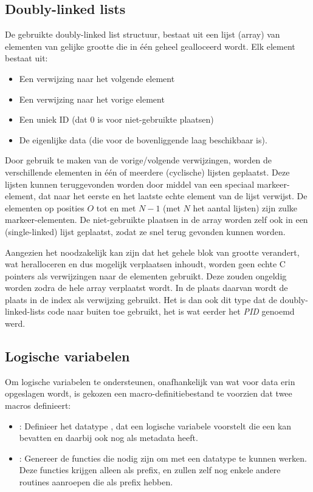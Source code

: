 \subsection{Doubly-linked lists} \label{sec:dll}

De gebruikte doubly-linked list structuur, bestaat uit een lijst (array) van elementen van gelijke grootte die in \'e\'en geheel gealloceerd wordt. Elk element bestaat uit: \begin{itemize}
  \item Een verwijzing naar het volgende element
  \item Een verwijzing naar het vorige element
  \item Een uniek ID (dat $0$ is voor niet-gebruikte plaatsen)
  \item De eigenlijke data (die voor de bovenliggende laag beschikbaar is).
\end{itemize}
Door gebruik te maken van de vorige/volgende verwijzingen, worden de verschillende elementen in \'e\'en of meerdere (cyclische) lijsten geplaatst. Deze lijsten kunnen teruggevonden worden door middel van een speciaal markeer-element, dat naar het eerste en het laatste echte element van de lijst verwijst. De elementen op posities $O$ tot en met $N-1$ (met $N$ het aantal lijsten) zijn zulke markeer-elementen. De niet-gebruikte plaatsen in de array worden zelf ook in een (single-linked) lijst geplaatst, zodat ze snel terug gevonden kunnen worden.

Aangezien het noodzakelijk kan zijn dat het gehele blok van grootte verandert, wat heralloceren en dus mogelijk verplaatsen inhoudt, worden geen echte C pointers als verwijzingen naar de elementen gebruikt. Deze zouden ongeldig worden zodra de hele array verplaatst wordt. In de plaats daarvan wordt de plaats in de index als verwijzing gebruikt. Het is dan ook dit type dat de doubly-linked-lists code naar buiten toe gebruikt, het is wat eerder het {\em PID} genoemd werd. 

\subsection{Logische variabelen} \label{sec:logvar}

Om logische variabelen te ondersteunen, onafhankelijk van wat voor data erin opgeslagen wordt, is gekozen een macro-definitiebestand te voorzien dat twee macros definieert: \begin{itemize}
  \item {}: Definieer het datatype , dat een logische variabele voorstelt die een  kan bevatten en daarbij ook nog  als metadata heeft.
  \item {}: Genereer de functies die nodig zijn om met een  datatype te kunnen werken. Deze functies krijgen alleen  als prefix, en zullen zelf nog enkele andere routines aanroepen die  als prefix hebben.
\end{itemize}

